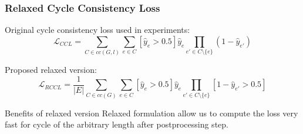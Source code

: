 \documentclass{beamer}
\begin{document}
\begin{frame}
    \frametitle{Relaxed Cycle Consistency Loss}

    Original cycle consistency loss used in experiments:
    \[
        \mathcal{L}_{CCL} =
        \sum\limits_{C \in cc(G, l)} \sum\limits_{e \in C}
        \left[\hat{y}_e > 0.5 \right] \hat{y}_e
        \prod\limits_{e' \in C \setminus \{e\}} (1 - \hat{y}_{e'})
    \]

    Proposed relaxed version:
    \[
        \mathcal{L}_{RCCL} = \frac{1}{|E|}
        \sum\limits_{C \in cc(G)} \sum\limits_{e \in C}
        \left[\hat{y}_e > 0.5 \right] \hat{y}_e
        \prod\limits_{e' \in C \setminus \{e\}}
        \left[ 1 - \hat{y}_{e'} > 0.5 \right]
    \]

    \begin{exampleblock}{Benefits of relaxed version}
        Relaxed formulation allow us to compute the loss very fast
        for cycle of the arbitrary length after postprocessing step.
    \end{exampleblock}

\end{frame}
\end{document}
